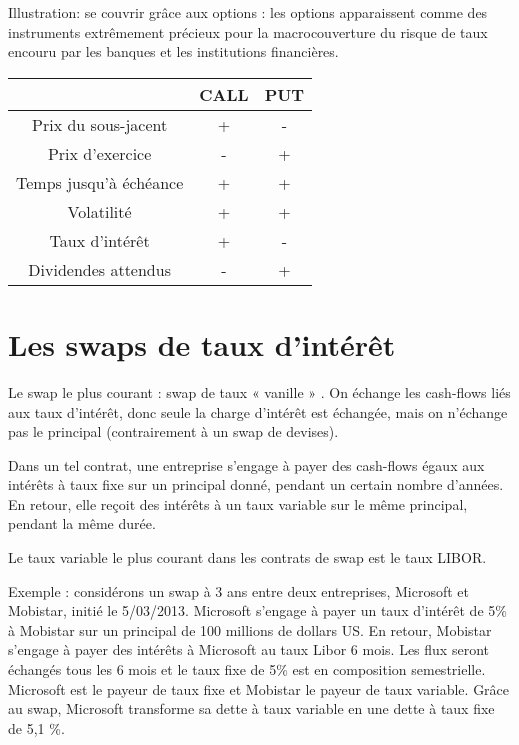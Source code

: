 Illustration: se couvrir grâce aux options : les options apparaissent comme des instruments extrêmement précieux pour la macrocouverture du risque de taux encouru par les banques et les institutions financières.

\begin{center}
\begin{tabular}{|c|c|c|}
\hline 
  & CALL & PUT \\ 
\hline 
Prix du sous-jacent & + & - \\ 
\hline 
Prix d'exercice & - & + \\ 
\hline 
Temps jusqu'à échéance & + & + \\ 
\hline 
Volatilité & + & + \\ 
\hline 
Taux d'intérêt & + & - \\ 
\hline 
Dividendes attendus & - & + \\ 
\hline 
\end{tabular} 
\end{center}


\section{Les swaps de taux d'intérêt}

Le swap le plus courant : swap de taux « vanille » . On échange les cash-flows liés aux taux d'intérêt, donc seule la charge d'intérêt est échangée, mais on n'échange pas le principal (contrairement à un swap de devises).

Dans un tel contrat, une entreprise s'engage à payer des cash-flows égaux aux intérêts à taux fixe sur un principal donné, pendant un certain nombre d'années. En retour, elle reçoit des intérêts à un taux variable sur le même principal, pendant la même durée. 

Le taux variable le plus courant dans les contrats de swap est le taux LIBOR. 

Exemple : considérons un swap à 3 ans entre deux entreprises, Microsoft et Mobistar, initié le 5/03/2013. Microsoft s’engage à payer un taux d'intérêt de 5\% à Mobistar sur un principal de 100 millions de dollars US. En retour, Mobistar s'engage à payer des intérêts à Microsoft au taux Libor 6 mois. Les flux seront échangés tous les 6 mois et le taux fixe de 5\% est en composition semestrielle. Microsoft est le payeur de taux fixe et Mobistar le payeur de taux variable. Grâce au swap, Microsoft transforme sa dette à taux variable en une dette à taux fixe de 5,1 \%.

